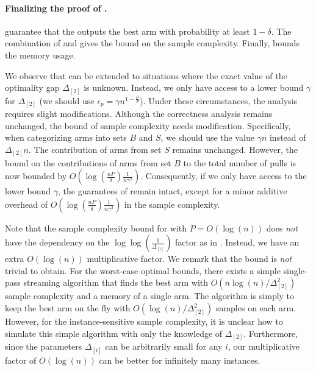 \paragraph{Finalizing the proof of .} 
 guarantee that the  outputs the best arm with probability at least \(1 - \delta\). The combination of  and  gives the bound on the sample complexity. Finally,  bounds the memory usage. 
\begin{observation}
\label{obs:delta-lower-bound}
We observe that  can be extended to situations where the exact value of the optimality gap \(\Delta_{[2]}\) is unknown. Instead, we only have access to a lower bound \(\gamma\) for \(\Delta_{[2]}\) (we should use \(\epsilon_p = \gamma n^{1-\frac{p}{P}}\)). Under these circumstances, the analysis requires slight modifications. Although the correctness analysis remains unchanged, the bound of sample complexity needs modification. Specifically, when categorizing arms into sets \(B\) and \(S\), we should use the value \(\gamma n\) instead of \(\Delta_{[2]}n\). The contribution of arms from set \(S\) remains unchanged. However, the bound on the contributions of arms from set \(B\) to the total number of pulls is now bounded by \(O\left(\log\left(\frac{nP}{\delta}\right)\frac{1}{n\gamma^2}\right)\). Consequently, if we only have access to the lower bound \(\gamma\), the guarantees of  remain intact, except for a minor additive overhead of \(O\left(\log\left(\frac{nP}{\delta}\right)\frac{1}{n\gamma^2}\right)\) in the sample complexity.
\end{observation}

\begin{remark}
\label{rmk:logn-overhead}
Note that the sample complexity bound for  with $P=O(\log(n))$ does \emph{not} have the dependency on the $\log\log(\frac{1}{\Delta_{[i]}})$ factor as in \cite{KarninKS13,JamiesonMNB14}. Instead, we have an extra $O(\log(n))$ multiplicative factor. We remark that the bound is \emph{not} trivial to obtain. For the worst-case optimal bounds, there exists a simple single-pass streaming algorithm that finds the best arm with $O(n\log(n)/\Delta^2_{[2]})$ sample complexity and a memory of a single arm. The algorithm is simply to keep the best arm on the fly with $O(\log(n)/\Delta^2_{[2]})$ samples on each arm. However, for the instance-sensitive sample complexity, it is unclear how to simulate this simple algorithm with only the knowledge of $\Delta_{[2]}$. Furthermore, since the parameters $\Delta_{[i]}$ can be arbitrarily small for any $i$, our multiplicative factor of $O(\log(n))$ can be better for infinitely many instances.
\end{remark}


